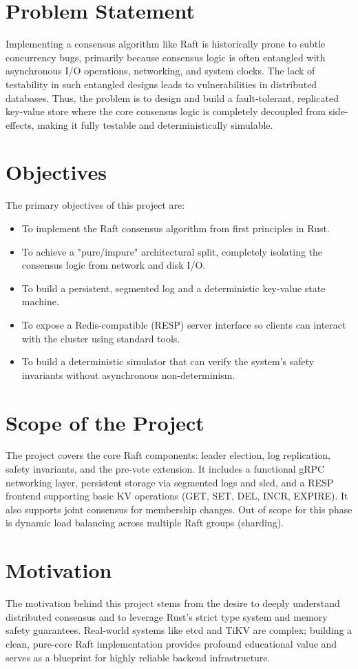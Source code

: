 \documentclass[12pt,a4paper]{report}
\begin{document}
\section{Problem Statement}
Implementing a consensus algorithm like Raft is historically prone to subtle concurrency bugs, primarily because consensus logic is often entangled with asynchronous I/O operations, networking, and system clocks. The lack of testability in such entangled designs leads to vulnerabilities in distributed databases. Thus, the problem is to design and build a fault-tolerant, replicated key-value store where the core consensus logic is completely decoupled from side-effects, making it fully testable and deterministically simulable.

\section{Objectives}
The primary objectives of this project are:
\begin{itemize}
    \item To implement the Raft consensus algorithm from first principles in Rust.
    \item To achieve a "pure/impure" architectural split, completely isolating the consensus logic from network and disk I/O.
    \item To build a persistent, segmented log and a deterministic key-value state machine.
    \item To expose a Redis-compatible (RESP) server interface so clients can interact with the cluster using standard tools.
    \item To build a deterministic simulator that can verify the system's safety invariants without asynchronous non-determinism.
\end{itemize}

\section{Scope of the Project}
The project covers the core Raft components: leader election, log replication, safety invariants, and the pre-vote extension. It includes a functional gRPC networking layer, persistent storage via segmented logs and sled, and a RESP frontend supporting basic KV operations (GET, SET, DEL, INCR, EXPIRE). It also supports joint consensus for membership changes. Out of scope for this phase is dynamic load balancing across multiple Raft groups (sharding).

\section{Motivation}
The motivation behind this project stems from the desire to deeply understand distributed consensus and to leverage Rust's strict type system and memory safety guarantees. Real-world systems like etcd and TiKV are complex; building a clean, pure-core Raft implementation provides profound educational value and serves as a blueprint for highly reliable backend infrastructure.
\end{document}
